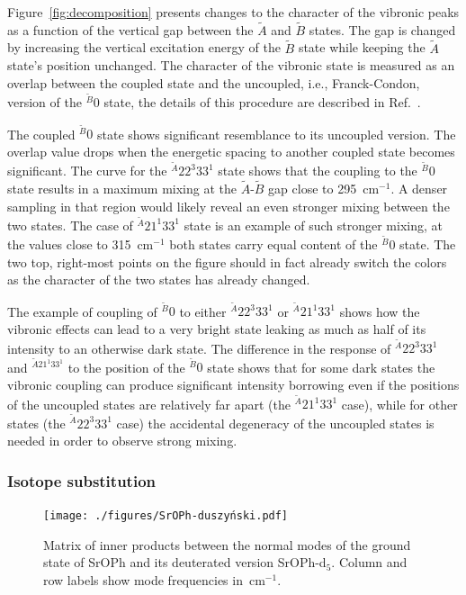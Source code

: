 \documentclass{article}
\begin{document}
Figure~\ref{fig:decomposition} presents changes to the character of the
vibronic peaks as a function of the vertical gap between the $\tilde{A}$ and
$\tilde{B}$ states. The gap is changed by increasing the vertical excitation
energy of the $\tilde{B}$ state while keeping the $\tilde{A}$ state's position
unchanged. The character of the vibronic state is measured as an overlap
between the coupled state and the uncoupled, i.e., Franck-Condon, version of
the $^{\tilde{B}}0$ state, the details of this procedure are described in
Ref.~\cite{Wojcik:ozone:2024}.

The coupled $^{\tilde{B}}0$ state shows significant resemblance to its
uncoupled version. The overlap value drops when the energetic spacing to
another coupled state becomes significant. The curve for the $^{\tilde{A}}22^3
33^1$ state shows that the coupling to the $^{\tilde{B}}0$ state results in a
maximum mixing at the $\tilde{A}$-$\tilde{B}$ gap close to 295~cm$^{-1}$. A
denser sampling in that region would likely reveal an even stronger mixing
between the two states. The case of $^{\tilde{A}}21 ^1 33 ^1$ state is an
example of such stronger mixing, at the values close to 315~cm$^{-1}$ both
states carry equal content of the $^{\tilde{B}}0$ state. The two top,
right-most points on the figure should in fact already switch the colors as the
character of the two states has already changed.

The example of coupling of $^{\tilde{B}}0$ to either $^{\tilde{A}}22^3 33^1$ or
$^{\tilde{A}}21 ^1 33 ^1$ shows how the vibronic effects can lead to a very
bright state leaking as much as half of its intensity to an otherwise dark
state. The difference in the response of $^{\tilde{A}}22 ^3 33 ^1$ and
$^{\tilde{A}21^1 33^1}$ to the position of the $^{\tilde{B}}0$ state shows that
for some dark states the vibronic coupling can produce significant intensity
borrowing even if the positions of the uncoupled states are relatively far
apart (the $^{\tilde{A}}21 ^1 33 ^1$ case), while for other states (the
$^{\tilde{A}} 22 ^3 33^1$ case) the accidental degeneracy of the uncoupled
states is needed in order to observe strong mixing.


\subsubsection{Isotope substitution}
\label{sec:results:simulations:isotope}

\begin{figure}
    \begin{center}
        \texttt{[image: ./figures/SrOPh-duszyński.pdf]}
    \end{center}
    \caption{
        Matrix of inner products between the normal modes of the ground state
        of SrOPh and its deuterated version SrOPh-d$_5$. Column and row labels
        show mode frequencies in~cm$^{-1}$.
    }
    \label{fig:sroph_duszynski}
\end{figure}
\end{document}

